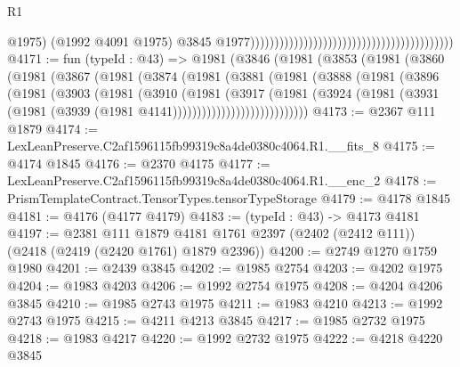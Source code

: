 \begin{lexlean}{R1}
\begin{coremodule}
                                                                                          @1975)
                                                                                        (@1992
                                                                                          @4091
                                                                                          @1975)
                                                                                        @3845
                                                                                        @1977))))))))))))))))))))))))))))))))))))))))))
@4171 := fun (typeId : @43) =>
  @1981
    (@3846
      (@1981
        (@3853
          (@1981
            (@3860
              (@1981
                (@3867
                  (@1981
                    (@3874
                      (@1981
                        (@3881
                          (@1981
                            (@3888
                              (@1981
                                (@3896
                                  (@1981
                                    (@3903
                                      (@1981
                                        (@3910
                                          (@1981
                                            (@3917
                                              (@1981
                                                (@3924
                                                  (@1981
                                                    (@3931
                                                      (@1981
                                                        (@3939
                                                          (@1981 @4141))))))))))))))))))))))))))))
@4173 := @2367 @111 @1879
@4174 := LexLeanPreserve.C2af1596115fb99319c8a4de0380c4064.R1.__fits_8
@4175 := @4174 @1845
@4176 := @2370 @4175
@4177 := LexLeanPreserve.C2af1596115fb99319c8a4de0380c4064.R1.__enc_2
@4178 := PrismTemplateContract.TensorTypes.tensorTypeStorage
@4179 := @4178 @1845
@4181 := @4176 (@4177 @4179)
@4183 := (typeId : @43) -> @4173 @4181
@4197 := @2381
    @111
    @1879
    @4181
    @1761
    @2397
    (@2402 (@2412 @111))
    (@2418 (@2419 (@2420 @1761) @1879 @2396))
@4200 := @2749 @1270 @1759 @1980
@4201 := @2439 @3845
@4202 := @1985 @2754
@4203 := @4202 @1975
@4204 := @1983 @4203
@4206 := @1992 @2754 @1975
@4208 := @4204 @4206 @3845
@4210 := @1985 @2743 @1975
@4211 := @1983 @4210
@4213 := @1992 @2743 @1975
@4215 := @4211 @4213 @3845
@4217 := @1985 @2732 @1975
@4218 := @1983 @4217
@4220 := @1992 @2732 @1975
@4222 := @4218 @4220 @3845

\end{coremodule}
\end{lexlean}

